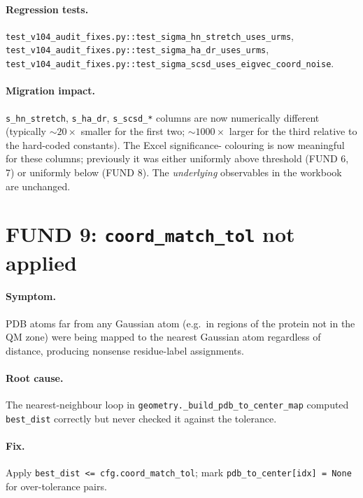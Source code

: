 \documentclass[10pt,a4paper,twoside]{article}
\newcommand{\fn}[1]{\texttt{#1}}
\begin{document}
\paragraph{Regression tests.}
\fn{test\_v104\_audit\_fixes.py::test\_sigma\_hn\_stretch\_uses\_urms},\\
\fn{test\_v104\_audit\_fixes.py::test\_sigma\_ha\_dr\_uses\_urms},\\
\fn{test\_v104\_audit\_fixes.py::test\_sigma\_scsd\_uses\_eigvec\_coord\_noise}.

\paragraph{Migration impact.}
\texttt{s\_hn\_stretch}, \texttt{s\_ha\_dr}, \texttt{s\_scsd\_*}
columns are now numerically different (typically $\sim 20\times$
smaller for the first two; $\sim 1000\times$ larger for the third
relative to the hard-coded constants). The Excel significance-
colouring is now meaningful for these columns; previously it was
either uniformly above threshold (FUND 6, 7) or uniformly below
(FUND 8). The \emph{underlying} observables in the workbook are
unchanged.

\section{FUND 9: \fn{coord\_match\_tol} not applied}
\label{sec:fund-9}

\paragraph{Symptom.}
PDB atoms far from any Gaussian atom (e.g.\ in regions of the
protein not in the QM zone) were being mapped to the nearest
Gaussian atom regardless of distance, producing nonsense
residue-label assignments.

\paragraph{Root cause.}
The nearest-neighbour loop in
\fn{geometry.\_build\_pdb\_to\_center\_map} computed \texttt{best\_dist}
correctly but never checked it against the tolerance.

\paragraph{Fix.}
Apply \texttt{best\_dist <= cfg.coord\_match\_tol}; mark
\texttt{pdb\_to\_center[idx] = None} for over-tolerance pairs.
\end{document}
